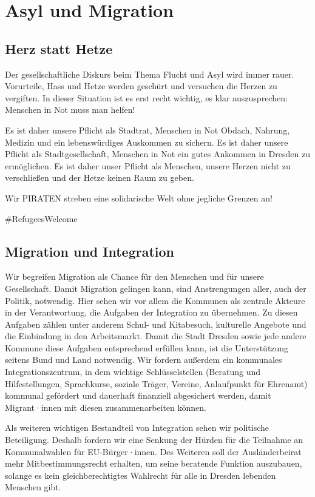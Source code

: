 \documentclass[a4paper, 11pt]{article}
\begin{document}
\section{Asyl und Migration}

\subsection{Herz statt Hetze}
Der gesellschaftliche Diskurs beim Thema Flucht und Asyl wird immer rauer. Vorurteile, Hass und Hetze werden geschürt und versuchen die Herzen zu vergiften. In dieser Situation ist es erst recht wichtig, es klar auszusprechen: Menschen in Not muss man helfen!\newline

Es ist daher unsere Pflicht als Stadtrat, Menschen in Not Obdach, Nahrung, Medizin und ein lebenswürdiges Auskommen zu sichern. Es ist daher unsere Pflicht als Stadtgesellschaft, Menschen in Not ein gutes Ankommen in Dresden zu ermöglichen. Es ist daher unser Pflicht als Menschen, unsere Herzen nicht zu verschließen und der Hetze keinen Raum zu geben.\newline

Wir PIRATEN streben eine solidarische Welt ohne jegliche Grenzen an!\newline

\#RefugeesWelcome


\subsection{Migration und Integration}
Wir begreifen Migration als Chance für den Menschen und für unsere Gesellschaft. Damit Migration gelingen kann, sind Anstrengungen aller, auch der Politik, notwendig. Hier sehen wir vor allem die Kommunen als zentrale Akteure in der Verantwortung, die Aufgaben der Integration zu übernehmen. Zu diesen Aufgaben zählen unter anderem Schul- und Kitabesuch, kulturelle Angebote und die Einbindung in den Arbeitsmarkt. Damit die Stadt Dresden sowie jede andere Kommune diese Aufgaben entsprechend erfüllen kann, ist die Unterstützung seitens Bund und Land notwendig. Wir fordern außerdem ein kommunales Integrationszentrum, in dem wichtige Schlüsselstellen (Beratung und Hilfestellungen, Sprachkurse, soziale Träger, Vereine, Anlaufpunkt für Ehrenamt) kommunal gefördert und dauerhaft finanziell abgesichert werden, damit Migrant·innen mit diesen zusammenarbeiten können.\newline

Als weiteren wichtigen Bestandteil von Integration sehen wir politische Beteiligung. Deshalb fordern wir eine Senkung der Hürden für die Teilnahme an Kommunalwahlen für EU-Bürger·innen. Des Weiteren soll der Ausländerbeirat mehr Mitbestimmungsrecht erhalten, um seine beratende Funktion auszubauen, solange es kein gleichberechtigtes Wahlrecht für alle in Dresden lebenden Menschen gibt.
\end{document}
